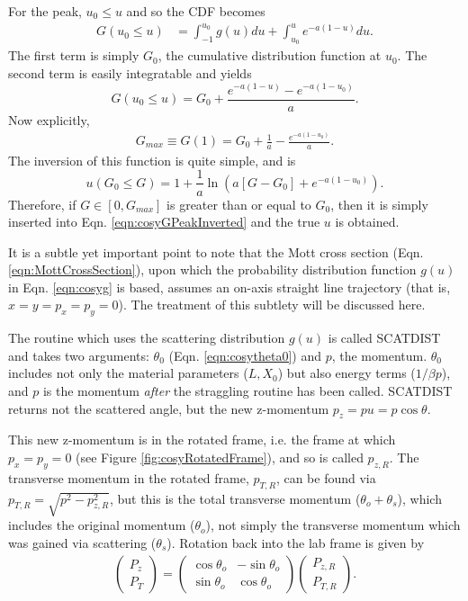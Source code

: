 For the peak, $u_0 \leq u$ and so the CDF becomes
\begin{align*}
G(u_0 \leq u)&=\int_{-1} ^{u_0} g(u) du + \int_{u_0} ^u e^{-a(1-u)} du.
\end{align*}
The first term is simply $G_0$, the cumulative distribution function at $u_0$. The second term is easily integratable and yields
\begin{equation}\label{eqn:cosyGPeak}
G(u_0 \leq u)=G_0 + \frac{e^{-a(1-u)}-e^{-a(1-u_0)}}{a}.
\end{equation}
Now explicitly,
\begin{align*}
G_{max}\equiv G(1) = G_0+\frac{1}{a}-\frac{e^{-a(1-u_0)}}{a}.
\end{align*}
The inversion of this function is quite simple, and is
\begin{equation} \label{eqn:cosyGPeakInverted}
u(G_0 \leq G)=1+\frac{1}{a} \ln (a[G-G_0]+e^{-a(1-u_0)}).
\end{equation}
Therefore, if $G \in [0,G_{max}]$ is greater than or equal to $G_0$, then it is simply inserted into Eqn. \ref{eqn:cosyGPeakInverted} and the true $u$ is obtained.

It is a subtle yet important point to note that the Mott cross section (Eqn. \ref{eqn:MottCrossSection}), upon which the probability distribution function $g(u)$ in Eqn. \ref{eqn:cosyg} is based, assumes an on-axis straight line trajectory (that is, $x=y=p_x = p_y =0$). The treatment of this subtlety will be discussed here.

The routine which uses the scattering distribution $g(u)$ is called SCATDIST and takes two arguments: $\theta_0$ (Eqn. \ref{eqn:cosytheta0}) and $p$, the momentum. $\theta_0$ includes not only the material parameters ($L, X_0$) but also energy terms ($1/\beta p$), and $p$ is the momentum \textit{after} the straggling routine has been called. SCATDIST returns not the scattered angle, but the new z-momentum $p_z=pu=p\cos\theta$. 

This new z-momentum is in the rotated frame, i.e. the frame at which $p_x=p_y=0$ (see Figure \ref{fig:cosyRotatedFrame}), and so is called $p_{z,R}$. The transverse momentum in the rotated frame, $p_{T,R}$, can be found via $p_{T,R}=\sqrt{p^2-p_{z,R}^2}$, but this is the total transverse momentum ($\theta_o + \theta_s$), which includes the original momentum ($\theta_o$), not simply the transverse momentum which was gained via scattering ($\theta_s$). Rotation back into the lab frame is given by
\begin{align*}
\begin{pmatrix}
P_{z} \\ P_T
\end{pmatrix}
=
\begin{pmatrix}
\cos\theta_o & -\sin\theta_o\\
\sin\theta_o & \cos\theta_o
\end{pmatrix}
\begin{pmatrix}
P_{z,R} \\ P_{T,R}
\end{pmatrix}.
\end{align*}

